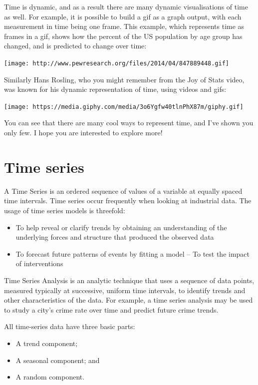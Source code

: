\documentclass[]{book}
\providecommand{\tightlist}{%
  \setlength{\itemsep}{0pt}\setlength{\parskip}{0pt}}
\theoremstyle{definition}
\theoremstyle{definition}
\theoremstyle{definition}
\theoremstyle{remark}
\begin{document}
Time is dynamic, and as a result there are many dynamic visualisations
of time as well. For example, it is possible to build a gif as a graph
output, with each measurement in time being one frame. This example,
which represents time as frames in a gif, shows how the percent of the
US population by age group has changed, and is predicted to change over
time:

\texttt{[image: http://www.pewresearch.org/files/2014/04/847889448.gif]}

Similarly Hans Rosling, who you might remember from the Joy of Stats
video, was known for his dynamic representation of time, using videos
and gifs:

\texttt{[image: https://media.giphy.com/media/3o6Ygfw40tlnPhX87m/giphy.gif]}

You can see that there are many cool ways to represent time, and I've
shown you only few. I hope you are interested to explore more!

\hypertarget{time-series}{%
\section{Time series}\label{time-series}}

A Time Series is an ordered sequence of values of a variable at equally
spaced time intervals. Time series occur frequently when looking at
industrial data. The usage of time series models is threefold:

\begin{itemize}
\tightlist
\item
  To help reveal or clarify trends by obtaining an understanding of the
  underlying forces and structure that produced the observed data
\item
  To forecast future patterns of events by fitting a model -- To test
  the impact of interventions
\end{itemize}

Time Series Analysis is an analytic technique that uses a sequence of
data points, measured typically at successive, uniform time intervals,
to identify trends and other characteristics of the data. For example, a
time series analysis may be used to study a city's crime rate over time
and predict future crime trends.

All time-series data have three basic parts:

\begin{itemize}
\tightlist
\item
  A trend component;
\item
  A seasonal component; and
\item
  A random component.
\end{itemize}
\end{document}
